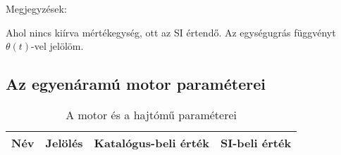 \clearpage

Megjegyzések:
\begin{outline}
  \1 Ahol nincs kiírva mértékegység, ott az SI értendő.
  \1 Az egységugrás függvényt $\theta(t)$-vel jelölöm.
\end{outline}

\subsection{Az egyenáramú motor paraméterei}

\begin{table}[H]
\begin{tabular}{llll}\toprule
Név& Jelölés& Katalógus-beli érték& SI-beli érték\\\midrule
\end{tabular}
\caption{A motor és a hajtómű paraméterei}
\end{table}

